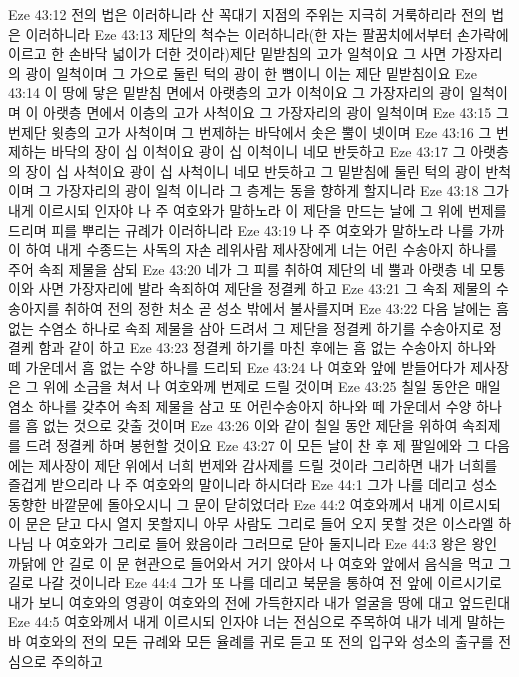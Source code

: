 Eze 43:12  전의 법은 이러하니라 산 꼭대기 지점의 주위는 지극히 거룩하리라 전의 법은 이러하니라
Eze 43:13  제단의 척수는 이러하니라(한 자는 팔꿈치에서부터 손가락에 이르고 한 손바닥 넓이가 더한 것이라)제단 밑받침의 고가 일척이요 그 사면 가장자리의 광이 일척이며 그 가으로 둘린 턱의 광이 한 뼘이니 이는 제단 밑받침이요
Eze 43:14  이 땅에 닿은 밑받침 면에서 아랫층의 고가 이척이요 그 가장자리의 광이 일척이며 이 아랫층 면에서 이층의 고가 사척이요 그 가장자리의 광이 일척이며
Eze 43:15  그 번제단 윗층의 고가 사척이며 그 번제하는 바닥에서 솟은 뿔이 넷이며
Eze 43:16  그 번제하는 바닥의 장이 십 이척이요 광이 십 이척이니 네모 반듯하고
Eze 43:17  그 아랫층의 장이 십 사척이요 광이 십 사척이니 네모 반듯하고 그 밑받침에 둘린 턱의 광이 반척이며 그 가장자리의 광이 일척 이니라 그 층계는 동을 향하게 할지니라
Eze 43:18  그가 내게 이르시되 인자야 나 주 여호와가 말하노라 이 제단을 만드는 날에 그 위에 번제를 드리며 피를 뿌리는 규례가 이러하니라
Eze 43:19  나 주 여호와가 말하노라 나를 가까이 하여 내게 수종드는 사독의 자손 레위사람 제사장에게 너는 어린 수송아지 하나를 주어 속죄 제물을 삼되
Eze 43:20  네가 그 피를 취하여 제단의 네 뿔과 아랫층 네 모퉁이와 사면 가장자리에 발라 속죄하여 제단을 정결케 하고
Eze 43:21  그 속죄 제물의 수송아지를 취하여 전의 정한 처소 곧 성소 밖에서 불사를지며
Eze 43:22  다음 날에는 흠 없는 수염소 하나로 속죄 제물을 삼아 드려서 그 제단을 정결케 하기를 수송아지로 정결케 함과 같이 하고
Eze 43:23  정결케 하기를 마친 후에는 흠 없는 수송아지 하나와 떼 가운데서 흠 없는 수양 하나를 드리되
Eze 43:24  나 여호와 앞에 받들어다가 제사장은 그 위에 소금을 쳐서 나 여호와께 번제로 드릴 것이며
Eze 43:25  칠일 동안은 매일 염소 하나를 갖추어 속죄 제물을 삼고 또 어린수송아지 하나와 떼 가운데서 수양 하나를 흠 없는 것으로 갖출 것이며
Eze 43:26  이와 같이 칠일 동안 제단을 위하여 속죄제를 드려 정결케 하며 봉헌할 것이요
Eze 43:27  이 모든 날이 찬 후 제 팔일에와 그 다음에는 제사장이 제단 위에서 너희 번제와 감사제를 드릴 것이라 그리하면 내가 너희를 즐겁게 받으리라 나 주 여호와의 말이니라 하시더라
Eze 44:1  그가 나를 데리고 성소 동향한 바깥문에 돌아오시니 그 문이 닫히었더라
Eze 44:2  여호와께서 내게 이르시되 이 문은 닫고 다시 열지 못할지니 아무 사람도 그리로 들어 오지 못할 것은 이스라엘 하나님 나 여호와가 그리로 들어 왔음이라 그러므로 닫아 둘지니라
Eze 44:3  왕은 왕인 까닭에 안 길로 이 문 현관으로 들어와서 거기 앉아서 나 여호와 앞에서 음식을 먹고 그 길로 나갈 것이니라
Eze 44:4  그가 또 나를 데리고 북문을 통하여 전 앞에 이르시기로 내가 보니 여호와의 영광이 여호와의 전에 가득한지라 내가 얼굴을 땅에 대고 엎드린대
Eze 44:5  여호와께서 내게 이르시되 인자야 너는 전심으로 주목하여 내가 네게 말하는바 여호와의 전의 모든 규례와 모든 율례를 귀로 듣고 또 전의 입구와 성소의 출구를 전심으로 주의하고
